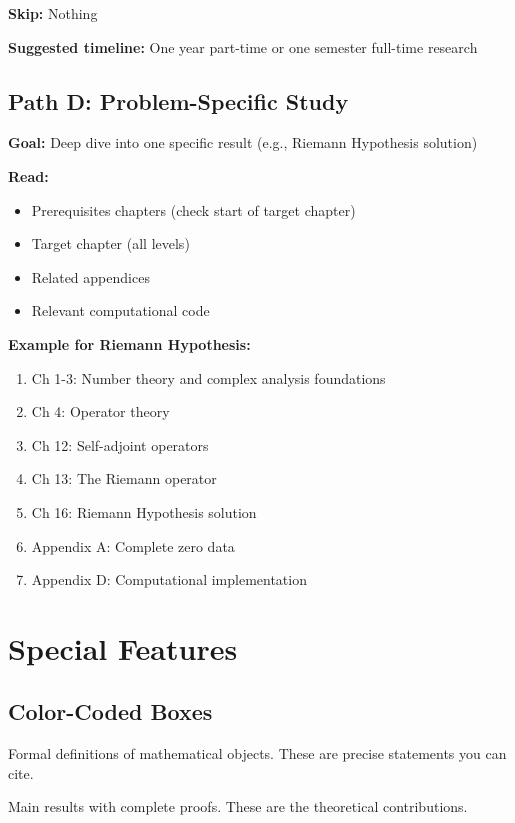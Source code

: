 \textbf{Skip:} Nothing

\textbf{Suggested timeline:} One year part-time or one semester full-time research

\subsection*{Path D: Problem-Specific Study}

\textbf{Goal:} Deep dive into one specific result (e.g., Riemann Hypothesis solution)

\textbf{Read:}
\begin{itemize}
\item Prerequisites chapters (check start of target chapter)
\item Target chapter (all levels)
\item Related appendices
\item Relevant computational code
\end{itemize}

\textbf{Example for Riemann Hypothesis:}
\begin{enumerate}
\item Ch 1-3: Number theory and complex analysis foundations
\item Ch 4: Operator theory
\item Ch 12: Self-adjoint operators
\item Ch 13: The Riemann operator
\item Ch 16: Riemann Hypothesis solution
\item Appendix A: Complete zero data
\item Appendix D: Computational implementation
\end{enumerate}

\section*{Special Features}

\subsection*{Color-Coded Boxes}

\begin{definition}[title={Blue Boxes}]
Formal definitions of mathematical objects. These are precise statements you can cite.
\end{definition}

\begin{theorem}[title={Green Boxes}]
Main results with complete proofs. These are the theoretical contributions.
\end{theorem}

